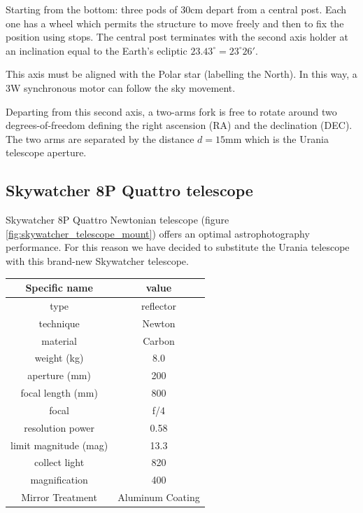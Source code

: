 \documentclass{article}
\begin{document}
\begin{multicols}{2}
        Starting from the bottom: three pods of 30cm depart from a central post. Each one has a wheel which permits the structure to move freely and then to fix the position using stops.
        The central post terminates with the second axis holder at an inclination equal to the Earth's ecliptic \(23.43^{\circ} = 23^{\circ} 26'\).

        This axis must be aligned with the Polar star (labelling the North).
        In this way, a 3W synchronous motor can follow the sky movement.

        Departing from this second axis, a two-arms fork is free to rotate around two degrees-of-freedom defining the right ascension (RA) and the declination (DEC).
        The two arms are separated by the distance \(d = 15\)mm which is the Urania telescope aperture.
        \subsection{Skywatcher 8P Quattro telescope}
        Skywatcher 8P Quattro Newtonian telescope (figure \ref{fig:skywatcher_telescope_mount}) offers an optimal astrophotography performance.
        For this reason we have decided to substitute the Urania telescope with this brand-new Skywatcher telescope.
        \\
        \begin{minipage}{0.5\textwidth}
            \centering
            \begin{tabular}{c|c}
                Specific name & value \\
                \hline
                type & reflector \\
                technique & Newton  \\
                material & Carbon  \\
                weight (kg) & 8.0 \\
                aperture (mm) & 200 \\
                focal length (mm) & 800 \\
                focal & f/4 \\
                resolution power & 0.58 \\
                limit magnitude (mag) & 13.3 \\
                collect light & 820 \\
                magnification & 400 \\
                Mirror Treatment & Aluminum Coating \\

\end{tabular}
\end{minipage}
\end{multicols}
\end{document}
